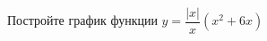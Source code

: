 \begin{ex}
	\begin{condition}
		Постройте график функции \( y=\dfrac{|x|}{x}(x^2+6x) \)
	\end{condition}
\end{ex}